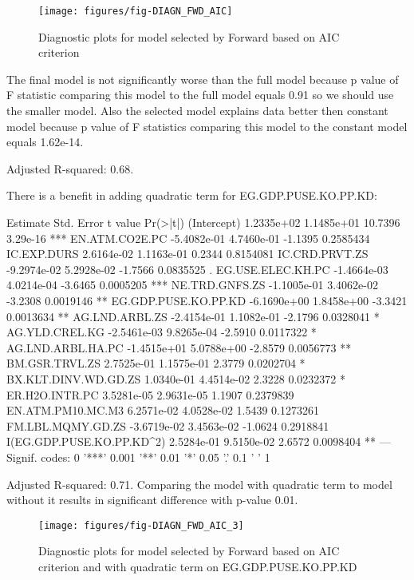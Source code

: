 \documentclass[a4paper]{article}
\begin{document}
\begin{figure}[H]
\begin{center}
\texttt{[image: figures/fig-DIAGN\_FWD\_AIC]}
\caption{Diagnostic plots for model selected by Forward based on AIC criterion}
\end{center}
\end{figure}

The final model is not significantly worse than
the full model because p value of F statistic comparing this model to the full
model equals
0.91 so we
 should use the smaller model. Also the selected model explains data better then constant model because p value of F statistics comparing this model to the constant model equals 
1.62e-14.

Adjusted R-squared:
0.68.

There is a benefit in adding quadratic term for EG.GDP.PUSE.KO.PP.KD:
\begin{Schunk}
\begin{Soutput}
                             Estimate  Std. Error t value  Pr(>|t|)    
(Intercept)                1.2335e+02  1.1485e+01 10.7396  3.29e-16 ***
EN.ATM.CO2E.PC            -5.4082e-01  4.7460e-01 -1.1395 0.2585434    
IC.EXP.DURS                2.6164e-02  1.1163e-01  0.2344 0.8154081    
IC.CRD.PRVT.ZS            -9.2974e-02  5.2928e-02 -1.7566 0.0835525 .  
EG.USE.ELEC.KH.PC         -1.4664e-03  4.0214e-04 -3.6465 0.0005205 ***
NE.TRD.GNFS.ZS            -1.1005e-01  3.4062e-02 -3.2308 0.0019146 ** 
EG.GDP.PUSE.KO.PP.KD      -6.1690e+00  1.8458e+00 -3.3421 0.0013634 ** 
AG.LND.ARBL.ZS            -2.4154e-01  1.1082e-01 -2.1796 0.0328041 *  
AG.YLD.CREL.KG            -2.5461e-03  9.8265e-04 -2.5910 0.0117322 *  
AG.LND.ARBL.HA.PC         -1.4515e+01  5.0788e+00 -2.8579 0.0056773 ** 
BM.GSR.TRVL.ZS             2.7525e-01  1.1575e-01  2.3779 0.0202704 *  
BX.KLT.DINV.WD.GD.ZS       1.0340e-01  4.4514e-02  2.3228 0.0232372 *  
ER.H2O.INTR.PC             3.5281e-05  2.9631e-05  1.1907 0.2379839    
EN.ATM.PM10.MC.M3          6.2571e-02  4.0528e-02  1.5439 0.1273261    
FM.LBL.MQMY.GD.ZS         -3.6719e-02  3.4563e-02 -1.0624 0.2918841    
I(EG.GDP.PUSE.KO.PP.KD^2)  2.5284e-01  9.5150e-02  2.6572 0.0098404 ** 
---
Signif. codes:  0 '***' 0.001 '**' 0.01 '*' 0.05 '.' 0.1 ' ' 1
\end{Soutput}
\end{Schunk}
Adjusted R-squared:
0.71. Comparing the
model with quadratic term to model without it results in significant difference
with p-value 0.01.

\begin{figure}[H]
\begin{center}
\texttt{[image: figures/fig-DIAGN\_FWD\_AIC\_3]}
\caption{Diagnostic plots for model selected by Forward based on AIC criterion
and with quadratic term on EG.GDP.PUSE.KO.PP.KD}
\end{center}
\end{figure}
\end{document}

